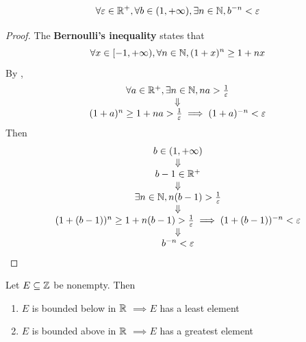 \bigskip

\begin{corollary} \label{an:cor:archimedean-property-corollary}
    \[
    \forall \varepsilon \in \mathbb{R}^{+}, \forall b \in (1, + \infty), \exists n \in \mathbb{N}, b^{-n} < \varepsilon
    \]
\end{corollary}

\begin{proof}
    The \textbf{Bernoulli's inequality} states that
    \[
    \forall x \in [-1, + \infty), \forall n \in \mathbb{N}, (1 + x)^{n} \geq 1 + nx
    \]
    By ,
    \[
    \begin{array}{c}
        \forall a \in \mathbb{R}^{+}, \exists n \in \mathbb{N}, na > \frac{1}{\varepsilon} \\
        \Downarrow \\
        (1 + a)^{n} \geq 1 + na > \frac{1}{\varepsilon} \implies (1 + a)^{-n} < \varepsilon
    \end{array}
    \]
    Then
    \[
    \begin{array}{c}
        b \in (1, + \infty) \\
        \Downarrow \\
        b - 1 \in \mathbb{R}^{+} \\
        \Downarrow \\
        \exists n \in \mathbb{N}, n(b - 1) > \frac{1}{\varepsilon} \\
        \Downarrow \\
        (1 + (b - 1))^{n} \geq 1 + n(b - 1) > \frac{1}{\varepsilon} \implies (1 + (b - 1))^{-n} < \varepsilon \\
        \Downarrow \\
        b^{-n} < \varepsilon
    \end{array}
    \]
\end{proof}

\bigskip

\begin{theorem} \label{an:thm:bounded-subset-of-Z-in-R-has-extremum}
    Let $E \subseteq \mathbb{Z}$ be nonempty. Then
    \begin{enumerate}[label=\textbf{(\Alph*)}]
        \item $E$ is bounded below in $\mathbb{R}$ $\implies E$ has a least element
        \item $E$ is bounded above in $\mathbb{R}$ $\implies E$ has a greatest element
    \end{enumerate}
\end{theorem}

